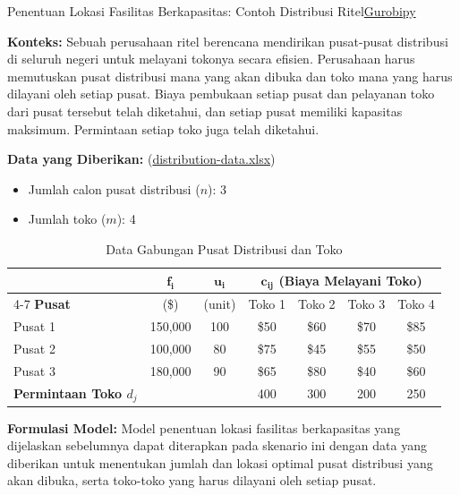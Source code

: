 \begin{examplewithcode}{Penentuan Lokasi Fasilitas Berkapasitas: Contoh Distribusi Ritel}{\href{https://github.com/open-optimization/open-optimization-or-examples/blob/master/integer-programming/facility-location-capacitated.ipynb}{Gurobipy}}

\textbf{Konteks:} Sebuah perusahaan ritel berencana mendirikan pusat-pusat distribusi di seluruh negeri untuk melayani tokonya secara efisien. Perusahaan harus memutuskan pusat distribusi mana yang akan dibuka dan toko mana yang harus dilayani oleh setiap pusat. Biaya pembukaan setiap pusat dan pelayanan toko dari pusat tersebut telah diketahui, dan setiap pusat memiliki kapasitas maksimum. Permintaan setiap toko juga telah diketahui.

\textbf{Data yang Diberikan:} (\href{https://github.com/open-optimization/open-optimization-or-examples/blob/master/integer-programming/distribution-data.xlsx}{distribution-data.xlsx})

\begin{itemize}
    \item Jumlah calon pusat distribusi ($n$): 3
    \item Jumlah toko ($m$): 4
\end{itemize}


\begin{table}[ht]
\centering
\caption{Data Gabungan Pusat Distribusi dan Toko}
\begin{tabular}{lcc|cccc}
\toprule
 & \(\mathbf{f_i}\) & \(\mathbf{u_i}\) & \multicolumn{4}{c}{\(\mathbf{c_{ij}}\) (Biaya Melayani Toko)} \\
\cmidrule(lr){4-7}
\textbf{Pusat} & (\$) & (unit) & Toko 1 & Toko 2 & Toko 3 & Toko 4 \\
\midrule
Pusat 1 & 150,000 & 100 & \$50 & \$60 & \$70 & \$85 \\
Pusat 2 & 100,000 & 80  & \$75 & \$45 & \$55 & \$50 \\
Pusat 3 & 180,000 & 90  & \$65 & \$80 & \$40 & \$60 \\
\midrule
\textbf{Permintaan Toko \(d_j\)} & & & 400 & 300 & 200 & 250 \\
\bottomrule
\end{tabular}
\end{table}

\textbf{Formulasi Model:}
Model penentuan lokasi fasilitas berkapasitas yang dijelaskan sebelumnya dapat diterapkan pada skenario ini dengan data yang diberikan untuk menentukan jumlah dan lokasi optimal pusat distribusi yang akan dibuka, serta toko-toko yang harus dilayani oleh setiap pusat.
\begin{center}
\par{}\label{fig:facility-location}%

\end{center}
\end{examplewithcode}

